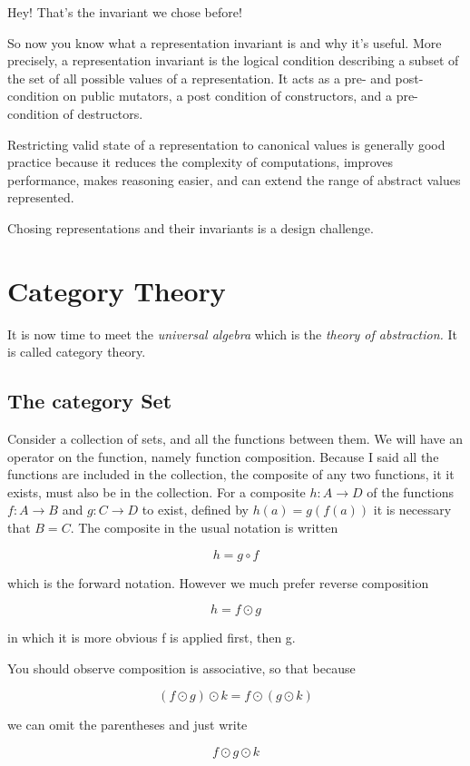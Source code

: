 \documentclass[oneside]{book}
\theoremstyle{plain}
\theoremstyle{definition}
\theoremstyle{plain}
\begin{document}
Hey! That's the invariant we chose before!

So now you know what a representation invariant is
and why it's useful. More precisely, a representation invariant is
the logical condition describing a subset of the set of all possible
values of a representation. It acts as a pre- and post- condition on
public mutators, a post condition of constructors, and a pre-condition
of destructors.

Restricting valid state of a representation to canonical values
is generally good practice because it reduces the complexity
of computations, improves performance, makes reasoning easier,
and can extend the range of abstract values represented.

Chosing representations and their invariants is a design challenge.

\chapter{Category Theory}
It is now time to meet the {\em universal algebra} which is the
{\em theory of abstraction.} It is called category theory.

\section{The category {\bf Set}}
Consider a collection of sets, and all the functions between them.
We will have an operator on the function, namely function composition.
Because I said all the functions are included in the collection,
the composite of any two functions, it it exists, must also be
in the collection. For a composite $h:A\rightarrow D$ of the functions $f:A\rightarrow B$ and
$g:C\rightarrow D$ to exist, defined by $h(a)=g(f(a))$ it is necessary that $B=C$.
The composite in the usual notation is written

$$h=g\circ f$$

which is the forward notation. However we much prefer reverse composition

$$h = f \odot g$$

in which it is more obvious f is applied first, then g.

You should observe composition is associative, so that because

$$(f \odot g) \odot k = f \odot (g \odot k)$$

we can omit the parentheses and just write

$$f \odot g \odot k$$
\end{document}
